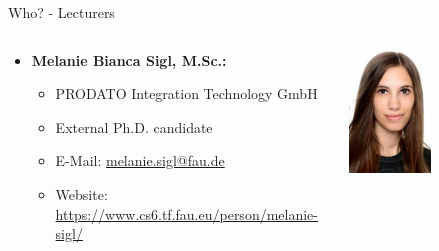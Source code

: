 \begin{frame}{Who? - Lecturers}
	\begin{columns}
		\begin{column}{0.8\textwidth}
			\begin{itemize}
				\item \textbf{Melanie Bianca Sigl, M.Sc.:}
				      \begin{itemize}
					      \item PRODATO Integration Technology GmbH
					      \item External Ph.D. candidate
					      \item E-Mail: \href{mailto:melanie.sigl@fau.de}{melanie.sigl@fau.de}
					      \item Website: \url{https://www.cs6.tf.fau.eu/person/melanie-sigl/}
				      \end{itemize}
			\end{itemize}
		\end{column}
		\begin{column}{0.2\textwidth}
			\begin{center}
				\includegraphics[width=0.5\textwidth]{img/melanie_b_sigl.jpg}
			\end{center}
		\end{column}
	\end{columns}


\end{frame}
